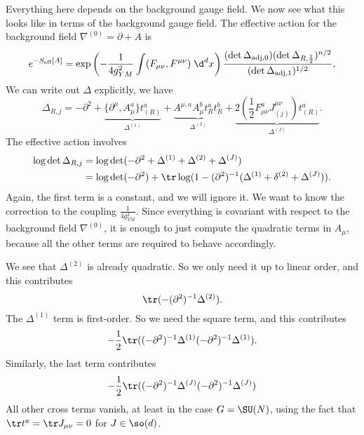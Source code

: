 \documentclass[a4paper]{article}
\begin{document}
Everything here depends on the background gauge field. We now see what this looks like in terms of the background gauge field. The effective action for the background field $\nabla^{(0)} = \partial + A$ is
\[
  e^{-S_{\mathrm{eff}}[A]} = \exp\left(- \frac{1}{4g_{YM}^2} \int (F_{\mu\nu}, F^{\mu\nu})\;\d^d x\right) \frac{(\det \Delta_{\mathrm{adj}, 0}) (\det \Delta_{R, \frac{1}{2}})^{n/2}}{(\det \Delta_{\mathrm{adj}, 1})^{1/2}},
\]
We can write out $\Delta$ explicitly, we have
\[
  \Delta_{R, j} = - \partial^2 + \underbrace{\{\partial^\mu, A_\mu^a\} t^a_{(R)}}_{\Delta^{(1)}} + \underbrace{A^{\mu, a} A_\mu^b t^a_R t^b_R}_{\Delta^{(2)}} + \underbrace{2 \left(\frac{1}{2} F^a_{\mu\nu} J^{\mu\nu}_{(j)}\right) t^a_{(R)}}_{\Delta^{(J)}}.
\]
The effective action involves
\begin{align*}
  \log \det \Delta_{R, j} &= \log \det (- \partial^2 + \Delta^{(1)} + \Delta^{(2)} + \Delta^{(J)})\\
  &= \log \det (- \partial^2) + \tr \log (1 - (\partial^2)^{-1} (\Delta^{(1)} + \delta^{(2)} + \Delta^{(J)})).
\end{align*}
Again, the first term is a constant, and we will ignore it. We want to know the correction to the coupling $\frac{1}{4 g_{YM}^2}$. Since everything is covariant with respect to the background field $\nabla^{(0)}$, it is enough to just compute the quadratic terms in $A_\mu$, because all the other terms are required to behave accordingly.

We see that $\Delta^{(2)}$ is already quadratic. So we only need it up to linear order, and this contributes
\[
  \tr (-(\partial^2)^{-1} \Delta^{(2)}).
\]
The $\Delta^{(1)}$ term is first-order. So we need the square term, and this contributes
\[
  -\frac{1}{2} \tr ((-\partial^2)^{-1} \Delta^{(1)} (-\partial^2)^{-1} \Delta^{(1)}).
\]
Similarly, the last term contributes
\[
  - \frac{1}{2} \tr ((-\partial^2)^{-1} \Delta^{(J)} (-\partial^2)^{-1} \Delta^{(J)})
\]
All other cross terms vanish, at least in the case $G = \SU(N)$, using the fact that $\tr t^a = \tr J_{\mu\nu} = 0$ for $J \in \so(d)$.
\end{document}

